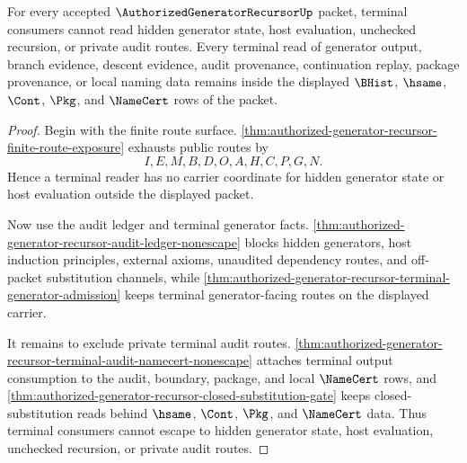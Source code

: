 \begin{theorem}
\label{thm:authorized-generator-recursor-terminal-reader-nonescape}
For every accepted $\AuthorizedGeneratorRecursorUp$ packet, terminal consumers cannot read hidden generator state, host evaluation, unchecked recursion, or private audit routes. Every terminal read of generator output, branch evidence, descent evidence, audit provenance, continuation replay, package provenance, or local naming data remains inside the displayed $\BHist$, $\hsame$, $\Cont$, $\Pkg$, and $\NameCert$ rows of the packet.
\end{theorem}
\begin{proof}
Begin with the finite route surface. \autoref{thm:authorized-generator-recursor-finite-route-exposure} exhausts public routes by
$$
I,E,M,B,D,O,A,H,C,P,G,N.
$$
Hence a terminal reader has no carrier coordinate for hidden generator state or host evaluation outside the displayed packet.

Now use the audit ledger and terminal generator facts. \autoref{thm:authorized-generator-recursor-audit-ledger-nonescape} blocks hidden generators, host induction principles, external axioms, unaudited dependency routes, and off-packet substitution channels, while \autoref{thm:authorized-generator-recursor-terminal-generator-admission} keeps terminal generator-facing routes on the displayed carrier.

It remains to exclude private terminal audit routes. \autoref{thm:authorized-generator-recursor-terminal-audit-namecert-nonescape} attaches terminal output consumption to the audit, boundary, package, and local $\NameCert$ rows, and \autoref{thm:authorized-generator-recursor-closed-substitution-gate} keeps closed-substitution reads behind $\hsame$, $\Cont$, $\Pkg$, and $\NameCert$ data. Thus terminal consumers cannot escape to hidden generator state, host evaluation, unchecked recursion, or private audit routes.
\end{proof}

